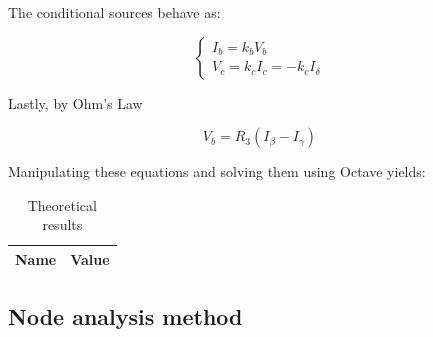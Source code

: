 The conditional sources behave as:

\begin{equation}
  \begin{cases}
  I_b = k_b V_b \\
  V_c = k_c I_c = - k_c I_\delta
  \end{cases}
\end{equation}

Lastly, by Ohm's Law

\begin{equation}
  V_b = R_3 (I_\beta - I_\gamma)
\end{equation}

Manipulating these equations and solving them using Octave yields:



\begin{table}[H]
  \centering
  \begin{tabular}{|c|c|}
    \hline
        {\bf Name} & {\bf Value} \\
        \hline
        \hline
        
        \hline
  \end{tabular}
  \caption{Theoretical results}
  \label{mesh_res}
\end{table}    

\subsection{Node analysis method}

